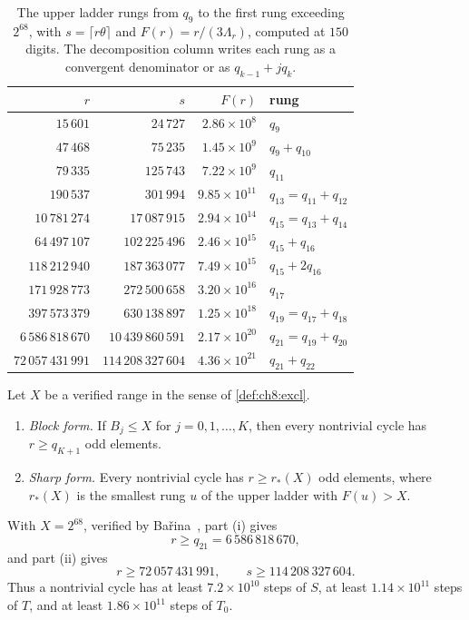 \begin{table}[ht]
\centering
\caption{The upper ladder rungs from $q_9$ to the first rung exceeding
$2^{68}$, with $s=\lceil r\theta\rceil$ and $F(r)=r/(3\Lambda_r)$, computed
at $150$ digits. The decomposition column writes each rung as a convergent denominator or as
$q_{k-1}+jq_k$.}
\label{tab:ch8:ladder}
\small
\begin{tabular}{@{}rrrl@{}}
\toprule
$r$ & $s$ & $F(r)$ & rung \\
\midrule
$15\,601$ & $24\,727$ & $2.86\times10^{8}$ & $q_9$ \\
$47\,468$ & $75\,235$ & $1.45\times10^{9}$ & $q_9+q_{10}$ \\
$79\,335$ & $125\,743$ & $7.22\times10^{9}$ & $q_{11}$ \\
$190\,537$ & $301\,994$ & $9.85\times10^{11}$ & $q_{13}=q_{11}+q_{12}$ \\
$10\,781\,274$ & $17\,087\,915$ & $2.94\times10^{14}$ & $q_{15}=q_{13}+q_{14}$ \\
$64\,497\,107$ & $102\,225\,496$ & $2.46\times10^{15}$ & $q_{15}+q_{16}$ \\
$118\,212\,940$ & $187\,363\,077$ & $7.49\times10^{15}$ & $q_{15}+2q_{16}$ \\
$171\,928\,773$ & $272\,500\,658$ & $3.20\times10^{16}$ & $q_{17}$ \\
$397\,573\,379$ & $630\,138\,897$ & $1.25\times10^{18}$ & $q_{19}=q_{17}+q_{18}$ \\
$6\,586\,818\,670$ & $10\,439\,860\,591$ & $2.17\times10^{20}$ & $q_{21}=q_{19}+q_{20}$ \\
$72\,057\,431\,991$ & $114\,208\,327\,604$ & $4.36\times10^{21}$ & $q_{21}+q_{22}$ \\
\bottomrule
\end{tabular}
\end{table}

\begin{theorem}\label{thm:cycles}
Let $X$ be a verified range in the sense of \cref{def:ch8:excl}.
\begin{enumerate}[label=(\roman*),leftmargin=2em]
\item \emph{Block form.} If $B_j\leq X$ for $j=0,1,\dots,K$, then every
  nontrivial cycle has $r\geq q_{K+1}$ odd elements.
\item \emph{Sharp form.} Every nontrivial cycle has $r\geq r_*(X)$ odd
  elements, where $r_*(X)$ is the smallest rung $u$ of the upper ladder with
  $F(u)>X$.
\end{enumerate}
With $X=2^{68}$, verified by Ba\v{r}ina~\cite{barina2021}, part (i) gives
\[
  r\geq q_{21}=6\,586\,818\,670,
\]
and part (ii) gives
\[
  r\geq72\,057\,431\,991,\qquad s\geq114\,208\,327\,604 .
\]
Thus a nontrivial cycle has at least $7.2\times10^{10}$ steps of $S$, at least
$1.14\times10^{11}$ steps of $T$, and at least $1.86\times10^{11}$ steps of
$T_0$.
\end{theorem}

